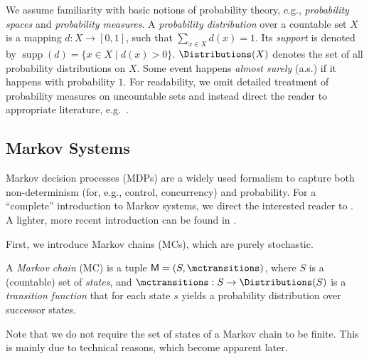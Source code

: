 \documentclass{article}
\newcommand{\distribution}{d}
\newcommand{\MC}{\mathsf{M}}
\newcommand{\States}{S}
\DeclareMathOperator{\support}{supp}
\begin{document}
We assume familiarity with basic notions of probability theory, e.g., \emph{probability spaces} and \emph{probability measures}.
A \emph{probability distribution} over a countable set $X$ is a mapping $\distribution : X \to [0,1]$, such that $\sum_{x \in X} \distribution(x) = 1$.
Its \emph{support} is denoted by $\support(\distribution) = \{x \in X \mid \distribution(x) > 0\}$.
$\Distributions(X)$ denotes the set of all probability distributions on $X$.
Some event happens \emph{almost surely} (a.s.) if it happens with probability $1$.
For readability, we omit detailed treatment of probability measures on uncountable sets and instead direct the reader to appropriate literature, e.g.\ \cite{billingsley2008probability}.
\subsection{Markov Systems}
Markov decision processes (MDPs) are a widely used formalism to capture both non-determinism (for, e.g., control, concurrency) and probability.
For a \enquote{complete} introduction to Markov systems, we direct the interested reader to \cite{DBLP:books/wi/Puterman94,kallenberg2011markov}.
A lighter, more recent introduction can be found in \cite[Chapter~2]{DBLP:phd/dnb/Meggendorfer21}.

First, we introduce Markov chains (MCs), which are purely stochastic.
\begin{definition}
	A \emph{Markov chain} (MC) is a tuple $\MC = (\States, \mctransitions)$, where
		$\States$ is a (countable) set of \emph{states}, and
		$\mctransitions : \States \to \Distributions(\States)$ is a \emph{transition function} that for each state $s$ yields a probability distribution over successor states.
\end{definition}
Note that we do not require the set of states of a Markov chain to be finite.
This is mainly due to technical reasons, which become apparent later.
\end{document}
